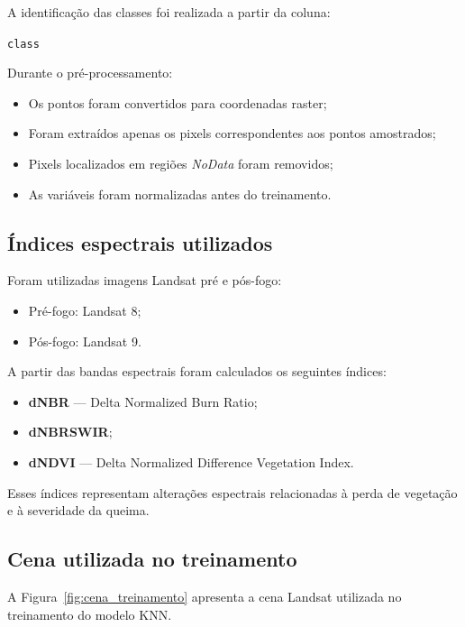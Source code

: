 \documentclass[12pt]{article}
\begin{document}
A identificação das classes foi realizada a partir da coluna:

\begin{center}
\texttt{class}
\end{center}

Durante o pré-processamento:

\begin{itemize}
    \item Os pontos foram convertidos para coordenadas raster;
    \item Foram extraídos apenas os pixels correspondentes aos pontos amostrados;
    \item Pixels localizados em regiões \textit{NoData} foram removidos;
    \item As variáveis foram normalizadas antes do treinamento.
\end{itemize}

\subsection{Índices espectrais utilizados}

Foram utilizadas imagens Landsat pré e pós-fogo:

\begin{itemize}
    \item Pré-fogo: Landsat 8;
    \item Pós-fogo: Landsat 9.
\end{itemize}

A partir das bandas espectrais foram calculados os seguintes índices:

\begin{itemize}
    \item \textbf{dNBR} --- Delta Normalized Burn Ratio;
    \item \textbf{dNBRSWIR};
    \item \textbf{dNDVI} --- Delta Normalized Difference Vegetation Index.
\end{itemize}

Esses índices representam alterações espectrais relacionadas à perda de vegetação e à severidade da queima.

\subsection{Cena utilizada no treinamento}

A Figura~\ref{fig:cena_treinamento} apresenta a cena Landsat utilizada no treinamento do modelo KNN.
\end{document}
